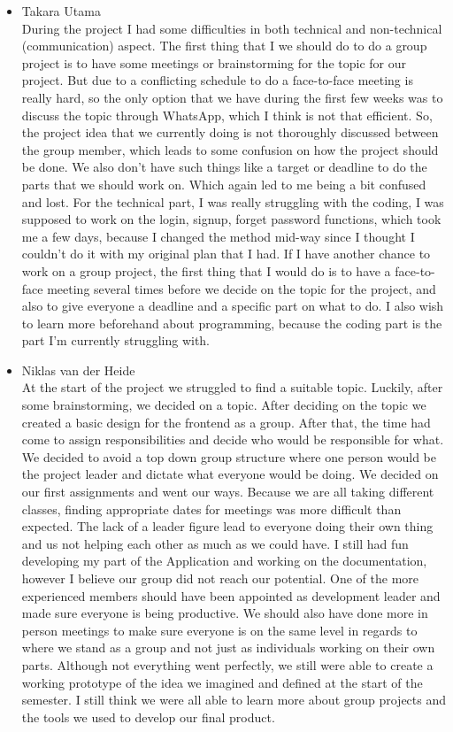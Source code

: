\documentclass[10pt]{article}
\begin{document}
\begin{multicols*}{2}
\begin{itemize}
  \item {Takara Utama}\\
  During the project I had some difficulties in both technical and non-technical (communication) aspect. The first thing that I we should do to do a group project is to have some meetings or brainstorming for the topic for our project. But due to a conflicting schedule to do a face-to-face meeting is really hard, so the only option that we have during the first few weeks was to discuss the topic through WhatsApp, which I think is not that efficient. So, the project idea that we currently doing is not thoroughly discussed between the group member, which leads to some confusion on how the project should be done. We also don’t have such things like a target or deadline to do the parts that we should work on. Which again led to me being a bit confused and lost. For the technical part, I was really struggling with the coding, I was supposed to work on the login, signup, forget password functions, which took me a few days, because I changed the method mid-way since I thought I couldn’t do it with my original plan that I had. If I have another chance to work on a group project, the first thing that I would do is to have a face-to-face meeting several times before we decide on the topic for the project, and also to give everyone a deadline and a specific part on what to do. I also wish to learn more beforehand about programming, because the coding part is the part I'm currently struggling with. 
  
  \item {Niklas van der Heide}\\
  At the start of the project we struggled to find a suitable topic. Luckily, after some brainstorming, we decided on a topic. After deciding on the topic we created a basic design for the frontend as a group. After that, the time had come to assign responsibilities and decide who would be responsible for what. We decided to avoid a top down group structure where one person would be the project leader and dictate what everyone would be doing. We decided on our first assignments and went our ways. Because we are all taking different classes, finding appropriate dates for meetings was more difficult than expected. The lack of a leader figure lead to everyone doing their own thing and us not helping each other as much as we could have. I still had fun developing my part of the Application and working on the documentation, however I believe our group did not reach our potential. One of the more experienced members should have been appointed as development leader and made sure everyone is being productive. We should also have done more in person meetings to make sure everyone is on the same level in regards to where we stand as a group and not just as individuals working on their own parts.
  Although not everything went perfectly, we still were able to create a working prototype of the idea we imagined and defined at the start of the semester. I still think we were all able to learn more about group projects and the tools we used to develop our final product.


\end{itemize}
\end{multicols*}
\end{document}
